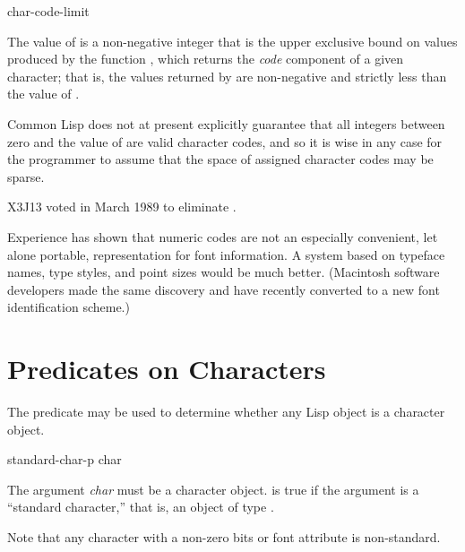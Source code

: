 \begin{defun}[Constant]
char-code-limit

The value of  is a non-negative
integer that is the upper exclusive bound on values produced
by the function , which returns the \emph{code} component
of a given character; that is, the values returned by 
are non-negative and strictly less than the value of
.

\begin{new}
Common Lisp does not at present explicitly guarantee that all integers between
zero and the value of  are valid character codes, and so
it is wise in any case for the programmer to assume that the space of
assigned character codes may be sparse.
\end{new}
\end{defun}

\begin{newer}
X3J13 voted in March 1989 
to eliminate .

Experience has shown that numeric codes are not an especially
convenient, let alone portable, representation for font information.
A system based on typeface names, type styles, and point sizes would be much better.
(Macintosh software developers made the same discovery and have recently
converted to a new font identification scheme.)
\end{newer}

\section{Predicates on Characters}

The predicate  may be used to determine
whether any Lisp object is a character object.

\begin{defun}[Function]
standard-char-p char

The argument \emph{char} must be a character object.
 is true if the argument is a ``standard character,''
that is, an object of type .

Note that any character with a non-zero bits or
font attribute is non-standard.
\end{defun}

